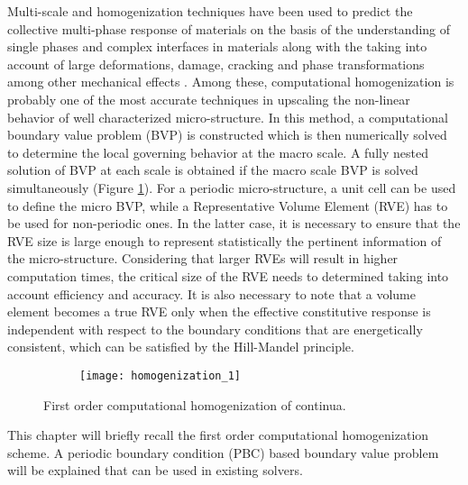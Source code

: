 Multi-scale and homogenization techniques have been used to predict the collective multi-phase response of materials on the basis of the understanding of single phases and complex interfaces in materials along with the taking into account of large deformations, damage, cracking and phase transformations among other mechanical effects \cite{geersMultiscaleComputationalHomogenization2010}. Among these, computational homogenization is probably one of the most accurate techniques in upscaling the non-linear behavior of well characterized micro-structure. In this method, a computational boundary value problem (BVP) is constructed which is then numerically solved to determine the local governing behavior at the macro scale. A fully nested solution of BVP at each scale is obtained if the macro scale BVP is solved simultaneously (Figure \ref{fig-ch-homogenization}). For a  periodic micro-structure, a unit cell can be used to define the micro BVP, while a Representative Volume Element (RVE) has to be used for non-periodic ones. In the latter case, it is necessary to ensure that the RVE size is large enough to represent statistically the pertinent information of the micro-structure. Considering that larger RVEs will result in higher computation times, the critical size of the RVE needs to determined taking into account efficiency and accuracy\cite{ostoja-starzewskiMechanicsRandomMaterials2001,kanitDeterminationSizeRepresentative2003}. It is also necessary to note that a volume element becomes a true RVE only when the effective constitutive response is independent with respect to the boundary conditions that are energetically consistent, which can be satisfied by the Hill-Mandel principle.

\begin{figure}
	\centering
	\begin{subfigure}[t]{0.75\textwidth}
		\texttt{[image: homogenization\_1]}
	\end{subfigure}
	\caption{First order computational homogenization of continua.}\label{fig-ch-homogenization}
\end{figure}



This chapter will briefly recall the first order computational homogenization scheme. A periodic boundary condition (PBC) based boundary value problem will be explained that can be used in existing solvers. 

